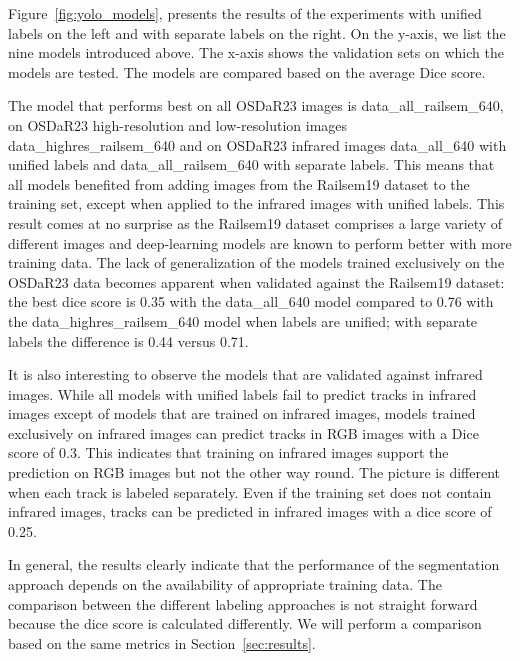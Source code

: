 \documentclass[Master,MDS,english]{BASE/twbook} %
\begin{document}
Figure~\ref{fig:yolo_models}, presents the results of the experiments with unified labels on the left and with separate labels on the right. On the y-axis, we list the nine models introduced above. The x-axis shows the validation sets on which the models are tested. The models are compared based on the average Dice score.

 The model that performs best on all OSDaR23 images is data\_all\_railsem\_640, on OSDaR23 high-resolution and low-resolution images data\_highres\_railsem\_640 and on OSDaR23 infrared images data\_all\_640 with unified labels and  data\_all\_railsem\_640 with separate labels. This means that all models benefited from adding images from the Railsem19 dataset to the training set, except when applied to the infrared images with unified labels. This result comes at no surprise as the Railsem19 dataset comprises a large variety of different images and deep-learning models are known to perform better with more training data. 
 The lack of generalization of the models trained exclusively on the OSDaR23 data becomes apparent when validated against the Railsem19 dataset: the best dice score is 0.35 with the data\_all\_640 model compared to 0.76 with the data\_highres\_railsem\_640 model when labels are unified; with separate labels the difference is 0.44 versus 0.71.

 It is also interesting to observe the models that are validated against infrared images. While all models with unified labels fail to predict tracks in infrared images except of models that are trained on infrared images, models trained exclusively on infrared images can predict tracks in RGB images with a Dice score of 0.3. This indicates that training on infrared images support the prediction on RGB images but not the other way round. The picture is different when each track is labeled separately. Even if the training set does not contain infrared images, tracks can be predicted in infrared images with a dice score of 0.25.

In general, the results clearly indicate that the performance of the segmentation approach depends on the availability of appropriate training data. The comparison between the different labeling approaches is not straight forward because the dice score is calculated differently. We will perform a comparison based on the same metrics in Section~\ref{sec:results}.


 
\end{document}
